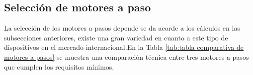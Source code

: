 

\subsection{Selección de motores a paso}
	
La selección de los motores a pasos depende se da acorde a los cálculos en las subsecciones anteriores, existe una gran variedad en cuanto a este tipo de dispositivos en el mercado internacional.En la Tabla \ref{tab:tabla comparativa de motores a pasos} se muestra una comparación técnica entre tres motores a pasos que cumplen los requisitos mínimos.	 

